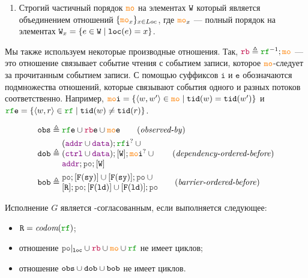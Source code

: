 \begin{definition}
\begin{enumerate}
\item Строгий частичный порядок $\lCO$ на элементах ${\mathtt{W}}$
      который является объединением отношений $\{\lCOx\}_{x\in\Loc}$,
      где $\lCOx$ --- полный порядок на элементах ${\mathtt{W}}_x = \{ e \in {\mathtt{W}} \; | \; {\mathtt{loc}}(e) = x\}$.
\end{enumerate}
\end{definition}

Мы также используем некоторые производные отношения. Так, $\lFR \defeq \lRF^{-1}; \lCO$ --- это отношение
связывает событие чтения с событием записи, которое $\lCO$-следует за прочитанным событием записи.
С помощью суффиксов $\mathtt{i}$ и $\mathtt{e}$ обозначаются подмножества отношений, которые связывают события одного
и разных потоков соответственно. Например, $\lCOI = \{ \tup{w, w'} \in \lCO \mid \lTID(w) = \lTID(w') \}$ и
$\lRFE = \{ \tup{w, r} \in \lRF \mid \lTID(w) \neq \lTID(r) \}$.

\begin{align*}
\lOBS &\defeq  \lRFE \cup \lFRE \cup \lCOE  \tag{\emph{observed-by}} \\
\lDOB &\defeq \inarr{(\lADDR \cup \lDATA); \lRFI^? \cup {} \\
	(\lCTRL \cup \lDATA); [\lW]; \lCOI^? \cup {} \\
	\lADDR; \lPO; [\lW]} \tag{\emph{dependency-ordered-before}} \\
\lBOB &\defeq \inarr{\lPO; [\lDMBSY] \cup [\lDMBSY]; \lPO  \cup {} \\
                    {} [\lR]; \lPO; [\lDMBLD] \cup [\lDMBLD]; \lPO} \tag{\emph{barrier-ordered-before}}
\end{align*}

\begin{definition}
Исполнение $G$ является \ARM-согласованным, если выполняется следующее:
\begin{itemize}
\item $\lR = \codom{\lRF}$; 
\item отношение $\lPO\rst{\lLOC} \cup \lFR \cup \lCO \cup \lRF$ не имеет циклов; 
\item отношение ${\mathtt{obs}} \cup {\mathtt{dob}} \cup {\mathtt{bob}}$ не имеет циклов. 
\end{itemize}
\end{definition}


